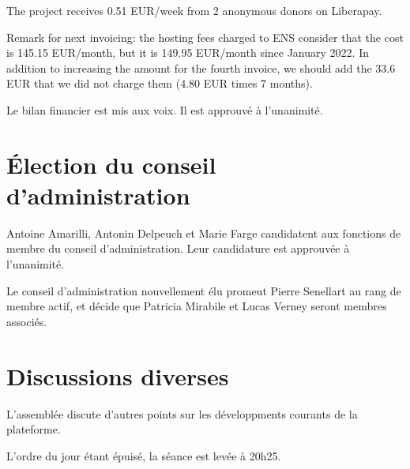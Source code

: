 \documentclass[a4paper]{article}
\begin{document}
The project receives 0.51 EUR/week from 2 anonymous donors on Liberapay.

Remark for next invoicing: the hosting fees charged to ENS consider that the cost is 145.15 EUR/month, but it is 149.95 EUR/month since January 2022. In addition to increasing the amount for the fourth invoice, we should add the 33.6 EUR that we did not charge them (4.80 EUR times 7 months).

Le bilan financier est mis aux voix. Il est approuvé à l'unanimité.

\section{Élection du conseil d'administration}

Antoine Amarilli, Antonin Delpeuch et Marie Farge candidatent aux fonctions de
membre du conseil d'administration. Leur candidature est approuvée à
l'unanimité.

Le conseil d'administration nouvellement élu promeut Pierre Senellart au rang de
membre actif, et décide que Patricia Mirabile et Lucas Verney seront membres
associés.

\section{Discussions diverses}

L'assemblée discute d'autres points sur les développments courants de la
plateforme.

L'ordre du jour étant épuisé, la séance est levée à 20h25.
\end{document}
